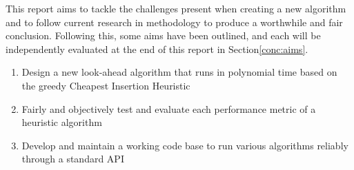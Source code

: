 This report aims to tackle the challenges present when creating a new algorithm and to follow current research in methodology to produce a worthwhile and fair conclusion. Following this, some aims have been outlined, and each will be independently evaluated at the end of this report in Section\ref{conc:aims}.

\begin{enumerate}
  \item Design a new look-ahead algorithm that runs in polynomial time based on the greedy Cheapest Insertion Heuristic
  \item Fairly and objectively test and evaluate each performance metric of a heuristic algorithm
  \item Develop and maintain a working code base to run various algorithms reliably through a standard API
\end{enumerate}